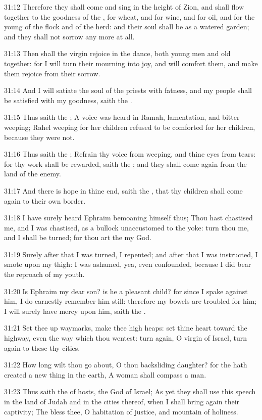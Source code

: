 31:12 Therefore they shall come and sing in the height of Zion, and shall flow together to the goodness of the \LORD, for wheat, and for wine, and for oil, and for the young of the flock and of the herd: and their soul shall be as a watered garden; and they shall not sorrow any more at all.

31:13 Then shall the virgin rejoice in the dance, both young men and old together: for I will turn their mourning into joy, and will comfort them, and make them rejoice from their sorrow.

31:14 And I will satiate the soul of the priests with fatness, and my people shall be satisfied with my goodness, saith the \LORD.

31:15 Thus saith the \LORD; A voice was heard in Ramah, lamentation, and bitter weeping; Rahel weeping for her children refused to be comforted for her children, because they were not.

31:16 Thus saith the \LORD; Refrain thy voice from weeping, and thine eyes from tears: for thy work shall be rewarded, saith the \LORD; and they shall come again from the land of the enemy.

31:17 And there is hope in thine end, saith the \LORD, that thy children shall come again to their own border.

31:18 I have surely heard Ephraim bemoaning himself thus; Thou hast chastised me, and I was chastised, as a bullock unaccustomed to the yoke: turn thou me, and I shall be turned; for thou art the \LORD my God.

31:19 Surely after that I was turned, I repented; and after that I was instructed, I smote upon my thigh: I was ashamed, yea, even confounded, because I did bear the reproach of my youth.

31:20 Is Ephraim my dear son? is he a pleasant child? for since I spake against him, I do earnestly remember him still: therefore my bowels are troubled for him; I will surely have mercy upon him, saith the \LORD.

31:21 Set thee up waymarks, make thee high heaps: set thine heart toward the highway, even the way which thou wentest: turn again, O virgin of Israel, turn again to these thy cities.

31:22 How long wilt thou go about, O thou backsliding daughter? for the \LORD hath created a new thing in the earth, A woman shall compass a man.

31:23 Thus saith the \LORD of hosts, the God of Israel; As yet they shall use this speech in the land of Judah and in the cities thereof, when I shall bring again their captivity; The \LORD bless thee, O habitation of justice, and mountain of holiness.

